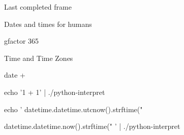 \documentclass[xcolor=svgnames,17pt]{beamer}
\begin{document}
\begin{frame}{Last completed frame}
\end{frame}

\begin{frame}[fragile]{Dates and times for humans}

\bash[stdout,script,prefix=$\space]
gfactor 365
\END

\end{frame}

\begin{frame}[fragile]{Time and Time Zones}

\bash[script,stdout,prefix=$\space]
date +%
\END

\bash[stdout,prefix=$\space]
echo '1 + 1' | ./python-interpret
\END

\bash[stdout]
echo '
datetime.datetime.utcnow().strftime("%


datetime.datetime.now().strftime("%
' | ./python-interpret
\END

\end{frame}
\end{document}
